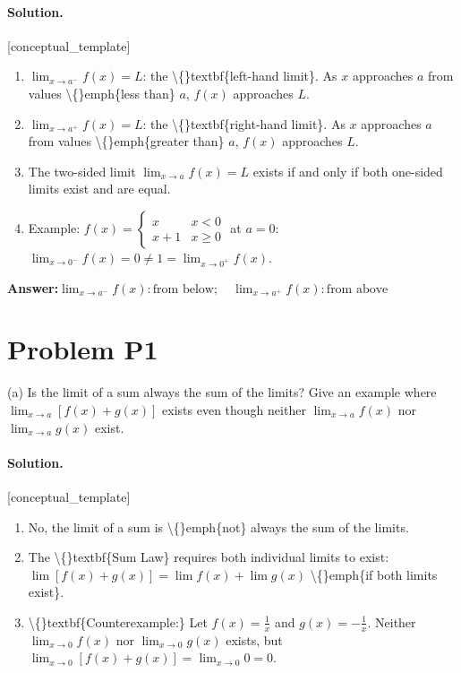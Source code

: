 \documentclass[11pt,a4paper]{article}
\newcommand{\solvertag}[1]{{\footnotesize\color{gray}\textsf{[#1]}}}
\begin{document}
\paragraph{Solution.} \solvertag{conceptual\_template} 

\begin{enumerate}[leftmargin=*]
  \item $\lim_{x \to a^-} f(x) = L$: the \textbackslash\{\}textbf\{left-hand limit\}. As $x$ approaches $a$ from values \textbackslash\{\}emph\{less than\} $a$, $f(x)$ approaches $L$.
  \item $\lim_{x \to a^+} f(x) = L$: the \textbackslash\{\}textbf\{right-hand limit\}. As $x$ approaches $a$ from values \textbackslash\{\}emph\{greater than\} $a$, $f(x)$ approaches $L$.
  \item The two-sided limit $\lim_{x \to a} f(x) = L$ exists if and only if both one-sided limits exist and are equal.
  \item Example: $f(x) = \begin{cases} x & x < 0 \\ x+1 & x \ge 0 \end{cases}$ at $a = 0$: $\lim_{x \to 0^-} f(x) = 0 \neq 1 = \lim_{x \to 0^+} f(x)$.
\end{enumerate}

\noindent\textbf{Answer:}\quad $\lim_{x \to a^-} f(x): \text{from below}; \quad \lim_{x \to a^+} f(x): \text{from above}$

\medskip

\section*{Problem P1}
(a) Is the limit of a sum always the sum of the limits? Give an example where $\lim_{x \to a}[f(x) + g(x)]$ exists even though neither $\lim_{x \to a} f(x)$ nor $\lim_{x \to a} g(x)$ exist.

\paragraph{Solution.} \solvertag{conceptual\_template} 

\begin{enumerate}[leftmargin=*]
  \item No, the limit of a sum is \textbackslash\{\}emph\{not\} always the sum of the limits.
  \item The \textbackslash\{\}textbf\{Sum Law\} requires both individual limits to exist: $\lim[f(x)+g(x)] = \lim f(x) + \lim g(x)$ \textbackslash\{\}emph\{if both limits exist\}.
  \item \textbackslash\{\}textbf\{Counterexample:\} Let $f(x) = \frac{1}{x}$ and $g(x) = -\frac{1}{x}$. Neither $\lim_{x \to 0} f(x)$ nor $\lim_{x \to 0} g(x)$ exists, but $\lim_{x \to 0}[f(x)+g(x)] = \lim_{x \to 0} 0 = 0$.
\end{enumerate}
\end{document}
